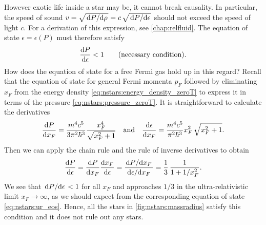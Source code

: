 However exotic life inside a star may be, it cannot break causality. 
In particular, the speed of sound $v = \sqrt{\odv{P}/{\rho}} = c \, \sqrt{\odv{P}/{\epsilon}}$ should not exceed the speed of light $c$.
For a derivation of this expression, see \cref{chap:relfluid}.
The equation of state $\epsilon = \epsilon(P)$ must therefore satisfy
\begin{equation}
	\odv{P}{\epsilon} < 1
	\qquad \text{(necessary condition)} .
\end{equation}
How does the equation of state for a free Fermi gas hold up in this regard?
Recall that the equation of state for general Fermi momenta $p_F$ followed by eliminating $x_F$ from the energy density \eqref{eq:nstars:energy_density_zeroT} to express it in terms of the pressure \eqref{eq:nstars:pressure_zeroT}.
It is straightforward to calculate the derivatives
\begin{equation}
	\odv{P}{x_F} = \frac{m^4 c^5}{3 \pi^2 \hbar^3} \frac{x_F^4}{\sqrt{x_F^2 + 1}}
	\quad \text{and} \quad
	\odv{\epsilon}{x_F} = \frac{m^4 c^5}{\pi^2 \hbar^3} x_F^2 \, \sqrt{x_F^2 + 1} .
\end{equation}
Then we can apply the chain rule and the rule of inverse derivatives to obtain
\begin{equation}
	\odv{P}{\epsilon} = 
	\odv{P}{x_F} \odv{x_F}{\epsilon} =
	\frac{\odv{P}/{x_F}}{\odv{\epsilon}/{x_F}} =
	\frac13 \, \frac{1}{1+1/x_F^2}.
\label{eq:nstars:dPde}
\end{equation}
We see that $\odv{P}/{\epsilon} < 1$ for all $x_F$ and approaches $1/3$ in the ultra-relativistic limit $x_F \rightarrow \infty$, as we should expect from the corresponding equation of state \eqref{eq:nstars:ur_eos}.
Hence, all the stars in \cref{fig:nstars:massradius} satisfy this condition and it does not rule out any stars.

